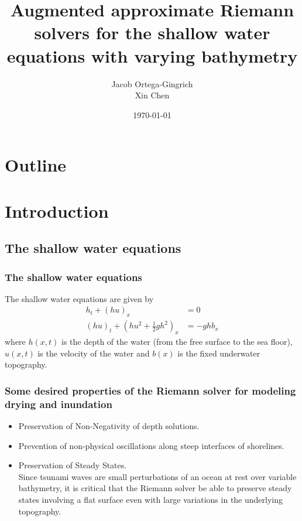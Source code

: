 \documentclass{beamer}
\title{Augmented approximate Riemann solvers for the shallow water equations with varying bathymetry}
\author{Jacob Ortega-Gingrich\\ Xin Chen}
\date{\today}
\begin{document}
\frame{\titlepage}


\section[Outline]{Outline}
\frame{\tableofcontents}

\section{Introduction}
\subsection{The shallow water equations}

\frame
{
 \frametitle{The shallow water equations}
 The shallow water equations are given by
 \begin{align*}
h_t+(h u)_x&=0\\
(h u)_t+\left(h u^2+\frac{1}{2} g h^2\right)_x&=-g h b_x
\end{align*}
where $h(x,t)$ is the depth of the water (from the free surface to the sea floor), $u(x,t)$ is the velocity of the water and $b(x)$ is the fixed underwater topography.
}

\frame
{
\frametitle{Some desired properties of the Riemann solver for modeling drying and inundation}
\begin{itemize}
\item<1-> Preservation of Non-Negativity of depth solutions.
\item<2-> Prevention of non-physical oscillations along steep interfaces of shorelines.
\item<3-> Preservation of Steady States. \\
Since tsunami waves are small perturbations of an ocean at rest over variable bathymetry, it is critical that the Riemann solver be able to preserve steady states involving a flat surface even with large variations in the underlying topography.
\end{itemize}
}
\end{document}
